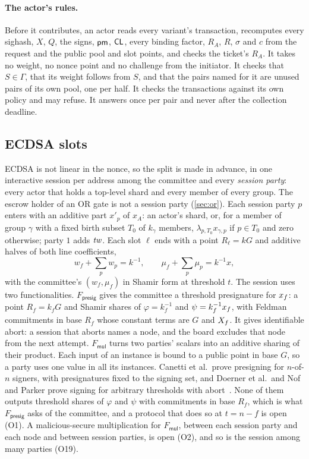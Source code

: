 \paragraph{The actor's rules.} Before it contributes, an actor reads every variant's transaction, recomputes every sighash, $X$, $Q$, the signs, $\mathsf{pm}$, $\mathsf{CL}$, every binding factor, $R_A$, $R$, $\sigma$ and $c$ from the request and the public pool and slot points, and checks the ticket's $R_A$. It takes no weight, no nonce point and no challenge from the initiator. It checks that $S \in \Gamma$, that its weight follows from $S$, and that the pairs named for it are unused pairs of its own pool, one per half. It checks the transactions against its own policy and may refuse. It answers once per pair and never after the collection deadline.

\subsection{ECDSA slots}\label{sec:ecdsa-slots}

ECDSA is not linear in the nonce, so the split is made in advance, in one interactive session per address among the committee and every \emph{session party}: every actor that holds a top-level shard and every member of every group. The escrow holder of an OR gate is not a session party (\cref{sec:or}). Each session party $p$ enters with an additive part $x'_p$ of $x_A$: an actor's shard, or, for a member of group $\gamma$ with a fixed birth subset $T_0$ of $k_\gamma$ members, $\lambda_{p,T_0} x_{\gamma,p}$ if $p \in T_0$ and zero otherwise; party $1$ adds $\mathit{tw}$. Each slot $\ell$ ends with a point $R_\ell = kG$ and additive halves of both line coefficients,
\[
  w_f + \sum_p w_p = k^{-1}, \qquad \mu_f + \sum_p \mu_p = k^{-1} x ,
\]
with the committee's $(w_f, \mu_f)$ in Shamir form at threshold $t$. The session uses two functionalities. $F_{\mathsf{presig}}$ gives the committee a threshold presignature for $x_{f}$: a point $R_f = k_f G$ and Shamir shares of $\varphi = k_f^{-1}$ and $\psi = k_f^{-1}x_{f}$, with Feldman commitments in base $R_f$ whose constant terms are $G$ and $X_{f}$. It gives identifiable abort: a session that aborts names a node, and the board excludes that node from the next attempt. $F_{\mathsf{mul}}$ turns two parties' scalars into an additive sharing of their product. Each input of an instance is bound to a public point in base $G$, so a party uses one value in all its instances. Canetti et al.\ prove presigning for $n$-of-$n$ signers, with presignatures fixed to the signing set, and Doerner et al.\ and Nof and Parker prove signing for arbitrary thresholds with abort~\cite{CGGMP21,DKLs23,TroutPP}. None of them outputs threshold shares of $\varphi$ and $\psi$ with commitments in base $R_f$, which is what $F_{\mathsf{presig}}$ asks of the committee, and a protocol that does so at $t = n - f$ is open (O1). A malicious-secure multiplication for $F_{\mathsf{mul}}$, between each session party and each node and between session parties, is open (O2), and so is the session among many parties (O19).

